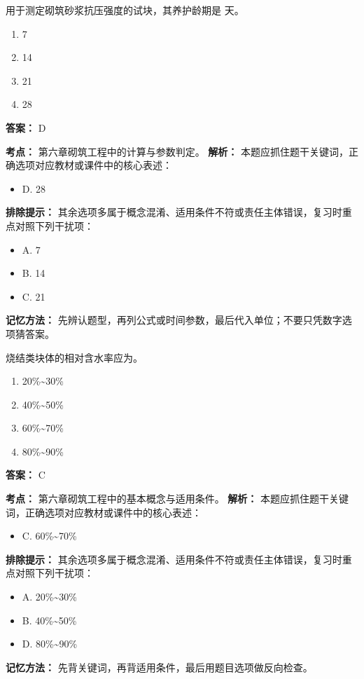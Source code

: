 \documentclass[UTF8,fontset=fandol,11pt]{ctexart}
\begin{document}
\begin{quizbox}[title={第 10 题}]
用于测定砌筑砂浆抗压强度的试块，其养护龄期是 天。\\
\begin{enumerate}[label=\Alph*.]
\item 7
\item 14
\item 21
\item 28
\end{enumerate}
\textbf{答案：} D
\vspace{0.25em}
\begin{answerbox}[title={考点解析}]
\textbf{考点：} 第六章砌筑工程中的计算与参数判定。
\textbf{解析：} 本题应抓住题干关键词，正确选项对应教材或课件中的核心表述：
\begin{itemize}
\item D. 28
\end{itemize}
\textbf{排除提示：} 其余选项多属于概念混淆、适用条件不符或责任主体错误，复习时重点对照下列干扰项：
\begin{itemize}
\item A. 7
\item B. 14
\item C. 21
\end{itemize}
\textbf{记忆方法：} 先辨认题型，再列公式或时间参数，最后代入单位；不要只凭数字选项猜答案。
\end{answerbox}
\end{quizbox}

\vspace{0.2em}

\begin{quizbox}[title={第 11 题}]
烧结类块体的相对含水率应为。\\
\begin{enumerate}[label=\Alph*.]
\item 20\%\textasciitilde{}30\%
\item 40\%\textasciitilde{}50\%
\item 60\%\textasciitilde{}70\%
\item 80\%\textasciitilde{}90\%
\end{enumerate}
\textbf{答案：} C
\vspace{0.25em}
\begin{answerbox}[title={考点解析}]
\textbf{考点：} 第六章砌筑工程中的基本概念与适用条件。
\textbf{解析：} 本题应抓住题干关键词，正确选项对应教材或课件中的核心表述：
\begin{itemize}
\item C. 60\%\textasciitilde{}70\%
\end{itemize}
\textbf{排除提示：} 其余选项多属于概念混淆、适用条件不符或责任主体错误，复习时重点对照下列干扰项：
\begin{itemize}
\item A. 20\%\textasciitilde{}30\%
\item B. 40\%\textasciitilde{}50\%
\item D. 80\%\textasciitilde{}90\%
\end{itemize}
\textbf{记忆方法：} 先背关键词，再背适用条件，最后用题目选项做反向检查。
\end{answerbox}
\end{quizbox}
\end{document}
